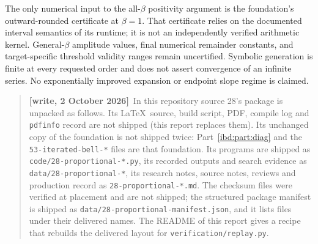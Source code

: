 \documentclass[11pt,letterpaper]{article}
\theoremstyle{remark}\newtheorem{remark}[theorem]{Remark}
\newenvironment{writenote}{\par\smallskip\begin{quote}\small\textbf{[write, 2 October 2026]}\ }{\end{quote}\smallskip}
\begin{document}
The only numerical input to the all-$\beta$ positivity argument is the foundation's outward-rounded certificate at $\beta=1$. That certificate relies on the documented interval semantics of its runtime; it is not an independently verified arithmetic kernel. General-$\beta$ amplitude values, final numerical remainder constants, and target-specific threshold validity ranges remain uncertified. Symbolic generation is finite at every requested order and does not assert convergence of an infinite series. No exponentially improved expansion or endpoint slope regime is claimed.
\begin{writenote}In this repository source 28's package is unpacked as follows. Its \LaTeX\ source, build script, PDF, compile log and \texttt{pdfinfo} record are not shipped (this report replaces them). Its unchanged copy of the foundation is not shipped twice: Part~\ref{ibd:part:diag} and the \texttt{53-iterated-bell-*} files are that foundation. Its programs are shipped as \texttt{code/28-proportional-*.py}, its recorded outputs and search evidence as \texttt{data/28-proportional-*}, its research notes, source notes, reviews and production record as \texttt{28-proportional-*.md}. The checksum files were verified at placement and are not shipped; the structured package manifest is shipped as \texttt{data/28-proportional-manifest.json}, and it lists files under their delivered names. The README of this report gives a recipe that rebuilds the delivered layout for \texttt{verification/replay.py}.\end{writenote}
\end{document}
